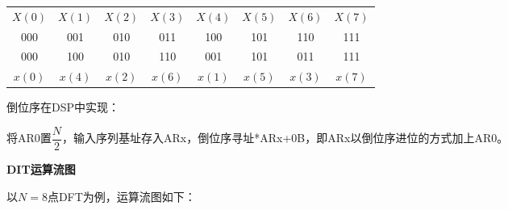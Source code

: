 \documentclass[cn, hazy, blue, normal, 12pt]{elegantnote}
\begin{document}
\begin{table}[htbp]
\centering
\begin{tabular}{|c|c|c|c|c|c|c|c|}
    $X(0)$ & $X(1)$ & $X(2)$ & $X(3)$ & $X(4)$ & $X(5)$ & $X(6)$ & $X(7)$ \\
    000 & 001 & 010 & 011 & 100 & 101 & 110 & 111 \\
    000 & 100 & 010 & 110 & 001 & 101 & 011 & 111 \\
    $x(0)$ & $x(4)$ & $x(2)$ & $x(6)$ & $x(1)$ & $x(5)$ & $x(3)$ & $x(7)$
\end{tabular}
\end{table}

倒位序在DSP中实现：

将AR0置$\dfrac{N}{2}$，输入序列基址存入ARx，倒位序寻址*ARx+0B，即ARx以倒位序进位的方式加上AR0。

\textbf{DIT运算流图}

以$N=8$点DFT为例，运算流图如下：
\end{document}
